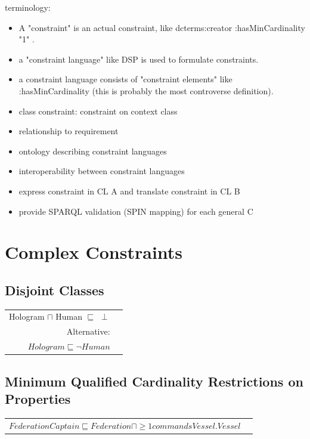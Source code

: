 \documentclass{llncs}
\newenvironment{DL}{
	\begin{center}
  \begin{tabular}{r l}

}{
  \end{tabular}
	\end{center}
}
\begin{document}
terminology:
\begin{itemize}
	\item A "constraint" is an actual constraint, like dcterms:creator :hasMinCardinality "1" .
  \item a "constraint language" like DSP is used to formulate constraints.
  \item a constraint language consists of "constraint elements" like :hasMinCardinality (this is probably the most controverse definition).
	\item class constraint: constraint on context class
\end{itemize}

\begin{itemize}
	\item relationship to requirement
  \item ontology describing constraint languages
	\item interoperability between constraint languages
  \item express constraint in CL A and translate constraint in CL B
  \item provide SPARQL validation (SPIN mapping) for each general C 
\end{itemize}

\section{Complex Constraints}

\subsection{Disjoint Classes}

\begin{DL}
Hologram $\sqcap$ Human $\sqsubseteq$ $\perp$\\
Alternative:\\
$Hologram \sqsubseteq \neg Human$
\end{DL}

\subsection{Minimum Qualified Cardinality Restrictions on Properties}

\begin{DL}
$FederationCaptain \sqsubseteq Federation \sqcap \geq1 commandsVessel . Vessel $
\end{DL}

{}

\setcounter{tocdepth}{1}
\end{document}
